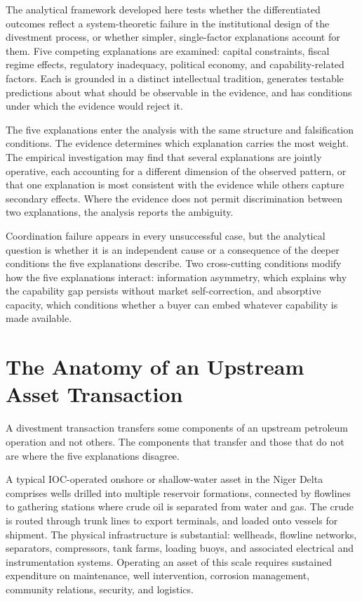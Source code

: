 \documentclass[twoside,fontset=lmodern]{mitthesis}
\begin{document}
The analytical framework developed here tests whether the differentiated
outcomes reflect a system-theoretic failure in the institutional design
of the divestment process, or whether simpler, single-factor
explanations account for them. Five competing explanations are examined:
capital constraints, fiscal regime effects, regulatory inadequacy,
political economy, and capability-related factors. Each is grounded in a
distinct intellectual tradition, generates testable predictions about
what should be observable in the evidence, and has conditions under
which the evidence would reject it.

The five explanations enter the analysis with the same structure and
falsification conditions. The evidence determines which explanation
carries the most weight. The empirical investigation may find that
several explanations are jointly operative, each accounting for a
different dimension of the observed pattern, or that one explanation is
most consistent with the evidence while others capture secondary
effects. Where the evidence does not permit discrimination between two
explanations, the analysis reports the ambiguity.

Coordination failure appears in every unsuccessful case, but the
analytical question is whether it is an independent cause or a
consequence of the deeper conditions the five explanations describe. Two
cross-cutting conditions modify how the five explanations interact:
information asymmetry, which explains why the capability gap persists
without market self-correction, and absorptive capacity, which
conditions whether a buyer can embed whatever capability is made
available.

\hypertarget{the-anatomy-of-an-upstream-asset-transaction}{%
\section{The Anatomy of an Upstream Asset
Transaction}\label{the-anatomy-of-an-upstream-asset-transaction}}

A divestment transaction transfers some components of an upstream
petroleum operation and not others. The components that transfer and
those that do not are where the five explanations disagree.

A typical IOC-operated onshore or shallow-water asset in the Niger Delta
comprises wells drilled into multiple reservoir formations, connected by
flowlines to gathering stations where crude oil is separated from water
and gas. The crude is routed through trunk lines to export terminals,
and loaded onto vessels for shipment. The physical infrastructure is
substantial: wellheads, flowline networks, separators, compressors, tank
farms, loading buoys, and associated electrical and instrumentation
systems. Operating an asset of this scale requires sustained expenditure
on maintenance, well intervention, corrosion management, community
relations, security, and logistics.
\end{document}
